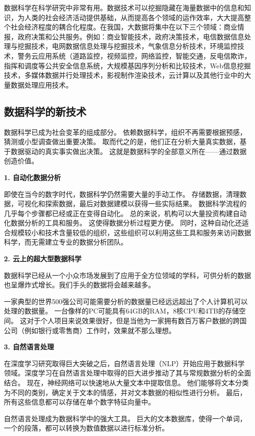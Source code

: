\documentclass[a4paper, 11pt,twoside=true,UTF8]{scrartcl}
\begin{document}
数据科学在科学研究中非常有用。数据技术可以挖掘隐藏在海量数据中的信息和知识，为人类的社会经济活动提供基础，从而提高各个领域的运作效率，大大提高整个社会经济程度的耦合化程度。在我国，大数据将集中在以下三个领域：商业情报，政府决策和公共服务。例如：商业智能技术，政府决策技术，电信数据信息处理与挖掘技术，电网数据信息处理与挖掘技术，气象信息分析技术，环境监控技术，警务云应用系统（道路监控，视频监控，网络监控，智能交通，反电信欺诈，指挥和调度等公共安全信息系统，大规模基因序列分析和比较技术，Web信息挖掘技术，多媒体数据并行处理技术，影视制作渲染技术，云计算以及其他行业中的大量数据处理应用技术。

\subsection{数据科学的新技术}
\qquad 数据科学已成为社会变革的组成部分。 依赖数据科学，组织不再需要根据预感，猜测或小型调查做出重要决策。 取而代之的是，他们正在分析大量真实数据，基于数据驱动的真实事实做出决策。 这就是数据科学的全部意义所在——通过数据创造价值。

\textbf{1. 自动化数据分析}

即使在当今的数字时代，数据科学仍然需要大量的手动工作。 存储数据，清理数据，可视化和探索数据，最后对数据建模以获得一些实际结果。 数据科学流程的几乎每个步骤都已经或正在变得自动化。
总的来说，机构可以大量投资构建自动化数据分析的工具和服务。 这使得数据分析过程更方便。 同时，这种自动化还适合规模较小和技术含量较低的组织，这些组织可以利用这些工具和服务来访问数据科学，而无需建立专业的数据分析团队。

\textbf{2. 云上的超大型数据科学}

数据科学已经从一个小众市场发展到了应用于全方位领域的学科，可供分析的数据也呈爆炸式增长。我们手头的数据将会越来越多。

一家典型的世界500强公司可能需要分析的数据量已经远远超出了个人计算机可以处理的数据量。 一台像样的PC可能具有64GB的RAM，8核CPU和4TB的存储空间。 这对于个人项目来说效果很好，但是当他为一家拥有数百万客户数据的跨国公司（例如银行或零售商）工作时，效果就不那么理想。

\textbf{3. 自然语言处理}

在深度学习研究取得巨大突破之后，自然语言处理（NLP）开始应用于数据科学领域。深度学习在自然语言处理中取得的巨大进步推动了其与常规数据分析的全面结合。 现在，神经网络可以快速地从大量文本中提取信息。 他们能够将文本分类为不同的类别，确定关于文本的情感，并对文本数据的相似性进行分析。 最后，所有这些信息都可以存储在单个数字特征向量中。

自然语言处理成为数据科学中的强大工具。 巨大的文本数据库，使得一个单词，一个的段落，都可以转换为数值数据以进行标准分析。
\end{document}
